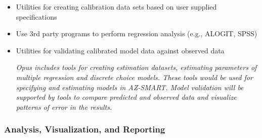 \begin{itemize}

\item Utilities for creating calibration data sets based on user supplied specifications
\item Use 3rd party programs to perform regression analysis (e.g., ALOGIT, SPSS)
\item Utilities for validating calibrated model data against observed data

\emph{Opus includes tools for creating estimation datasets, estimating parameters of multiple regression and discrete choice models.  These tools would be used for specifying and estimating models in AZ-SMART.  Model validation will be supported by tools to compare predicted and observed data and visualize patterns of error in the results.}

\end{itemize}

\subsubsection{Analysis, Visualization, and Reporting}

